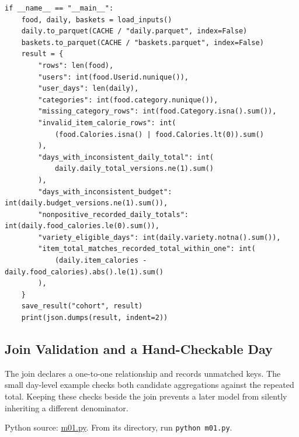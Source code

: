 \begin{Verbatim}[breaklines,breakanywhere,fontsize=\small]
if __name__ == "__main__":
    food, daily, baskets = load_inputs()
    daily.to_parquet(CACHE / "daily.parquet", index=False)
    baskets.to_parquet(CACHE / "baskets.parquet", index=False)
    result = {
        "rows": len(food),
        "users": int(food.Userid.nunique()),
        "user_days": len(daily),
        "categories": int(food.category.nunique()),
        "missing_category_rows": int(food.Category.isna().sum()),
        "invalid_item_calorie_rows": int(
            (food.Calories.isna() | food.Calories.lt(0)).sum()
        ),
        "days_with_inconsistent_daily_total": int(
            daily.daily_total_versions.ne(1).sum()
        ),
        "days_with_inconsistent_budget": int(daily.budget_versions.ne(1).sum()),
        "nonpositive_recorded_daily_totals": int(daily.food_calories.le(0).sum()),
        "variety_eligible_days": int(daily.variety.notna().sum()),
        "item_total_matches_recorded_total_within_one": int(
            (daily.item_calories - daily.food_calories).abs().le(1).sum()
        ),
    }
    save_result("cohort", result)
    print(json.dumps(result, indent=2))
\end{Verbatim}

\hypertarget{M01-join-validation-and-a-hand-checkable-day}{%
\subsection{Join Validation and a Hand-Checkable
Day}\label{M01-join-validation-and-a-hand-checkable-day}}

\noindent The join declares a one-to-one relationship and records unmatched keys.
The small day-level example checks both candidate aggregations against
the repeated total. Keeping these checks beside the join prevents a
later model from silently inheriting a different denominator.

\FloatBarrier
{}
Python source:
\href{../03_Data_and_Code/mHealth/recurring_examples/m01.py}{m01.py}.
From its directory, run \texttt{python\ m01.py}.

